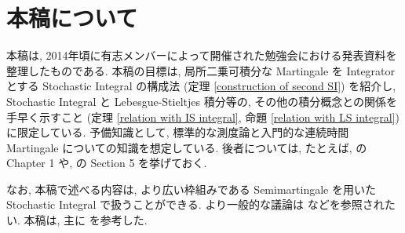 \documentclass[a4paper,12pt]{article}
\begin{document}
\section*{本稿について}
本稿は, 2014年頃に有志メンバーによって開催された勉強会における発表資料を整理したものである. 本稿の目標は, 局所二乗可積分な Martingale を Integrator とする Stochastic Integral の構成法 (定理 \ref{construction of second SI}) を紹介し, Stochastic Integral と Lebesgue-Stieltjes 積分等の, その他の積分概念との関係を手早く示すこと (定理 \ref{relation with IS integral}, 命題 \ref{relation with LS integral}) に限定している. 予備知識として, 標準的な測度論と入門的な連続時間 Martingale についての知識を想定している. 後者については, たとえば, \cite{Karatzas-Shreve:bmsc} の Chapter 1 や, \cite{Rogers-Williams:dmm1} の Section 5 を挙げておく. 

なお, 本稿で述べる内容は, より広い枠組みである Semimartingale を用いた Stochastic Integral で扱うことができる. より一般的な議論は \cite{Rogers-Williams:dmm2}\cite{Protter:si-and-de}\cite{Medvegyev:sit}\cite{Karatzas-Shreve:bmsc}などを参照されたい. 本稿は, 主に \cite{Medvegyev:sit}\cite{KunitaWatanabe} を参考した.
\end{document}
